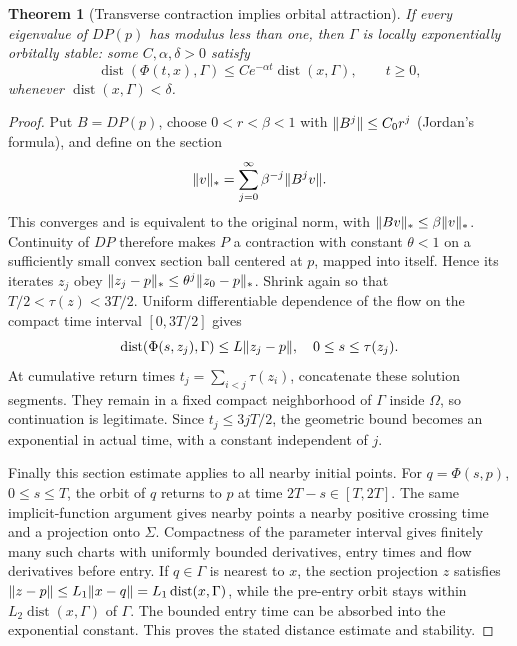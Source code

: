 \documentclass[11pt,oneside]{book}
\newtheorem{theorem}{Theorem}[chapter]
\theoremstyle{definition}
\theoremstyle{remark}\newtheorem{remark}[theorem]{Remark}
\begin{document}
\begin{theorem}[Transverse contraction implies orbital attraction]\label{d13:14:orbital-stability}
If every eigenvalue of \(DP(p)\) has modulus less than one, then
\(\Gamma\) is locally exponentially orbitally stable:
some \(C,\alpha,\delta>0\) satisfy
\[
 \operatorname{dist}(\Phi(t,x),\Gamma)
 \le C e^{-\alpha t}\operatorname{dist}(x,\Gamma),\qquad t\ge0,
\]
whenever \(\operatorname{dist}(x,\Gamma)<\delta\).
\end{theorem}
\begin{proof}
Put \(B=DP(p)\), choose \(0<r<\beta<1\) with
\(\lVert B^j\rVert\le C_0r^j\) (Jordan's formula), and define on the section
\[
 \lVert v\rVert_*=\sum_{j=0}^{\infty}\beta^{-j}\lVert B^jv\rVert.
\]
This converges and is equivalent to the original norm, with
\(\lVert Bv\rVert_*\le\beta\lVert v\rVert_*\).
Continuity of \(DP\) therefore makes \(P\) a contraction with constant
\(\theta<1\) on a sufficiently small convex section ball centered at
\(p\), mapped into itself. Hence its iterates \(z_j\) obey
\(\lVert z_j-p\rVert_*\le\theta^j\lVert z_0-p\rVert_*\).
Shrink again so that \(T/2<\tau(z)<3T/2\).
Uniform differentiable dependence of the flow on the compact time
interval \([0,3T/2]\) gives
\[
 \operatorname{dist}(\Phi(s,z_j),\Gamma)
 \le L\lVert z_j-p\rVert,\quad 0\le s\le\tau(z_j).
\]
At cumulative return times \(t_j=\sum_{i<j}\tau(z_i)\), concatenate
these solution segments. They remain in a fixed compact neighborhood
of \(\Gamma\) inside \(\Omega\), so continuation is legitimate.
Since \(t_j\le3jT/2\), the geometric bound becomes an exponential
in actual time, with a constant independent of \(j\).

Finally this section estimate applies to all nearby initial points.
For \(q=\Phi(s,p)\), \(0\le s\le T\), the orbit of \(q\) returns to
\(p\) at time \(2T-s\in[T,2T]\). The same implicit-function argument
gives nearby points a nearby positive crossing time and a projection
onto \(\Sigma\). Compactness of the parameter interval gives finitely
many such charts with uniformly bounded derivatives, entry times and
flow derivatives before entry. If \(q\in\Gamma\) is nearest to \(x\),
the section projection \(z\) satisfies
\(\lVert z-p\rVert\le L_1\lVert x-q\rVert
=L_1\operatorname{dist}(x,\Gamma)\), while the pre-entry orbit stays
within \(L_2\operatorname{dist}(x,\Gamma)\) of \(\Gamma\).
The bounded entry time can be absorbed into the exponential constant.
This proves the stated distance estimate and stability.
\end{proof}
\end{document}
